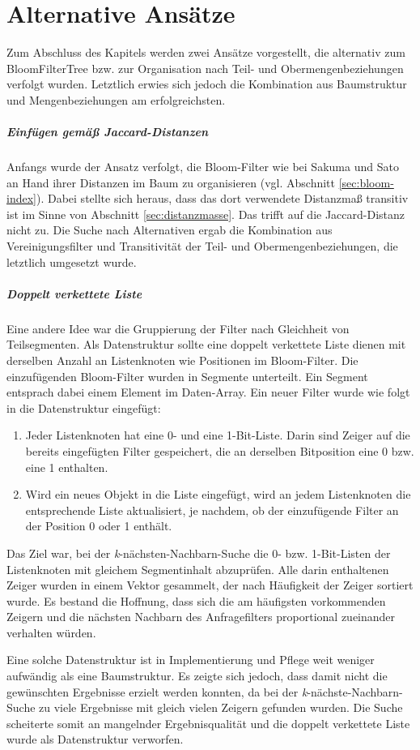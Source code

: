 \section{Alternative Ansätze}\label{sec:alternativen}
Zum Abschluss des Kapitels werden zwei Ansätze vorgestellt, die alternativ zum BloomFilterTree bzw. zur Organisation nach Teil- und Obermengenbeziehungen verfolgt wurden. Letztlich erwies sich jedoch die Kombination aus Baumstruktur und Mengenbeziehungen am erfolgreichsten. 
\subparagraph*{Einfügen gemäß Jaccard-Distanzen}
Anfangs wurde der Ansatz verfolgt, die Bloom-Filter wie bei Sakuma und Sato an Hand ihrer Distanzen im Baum zu organisieren (vgl. Abschnitt \ref{sec:bloom-index}). Dabei stellte sich heraus, dass das dort verwendete Distanzmaß transitiv ist im Sinne von Abschnitt \ref{sec:distanzmasse}. Das trifft auf die Jaccard-Distanz nicht zu. Die Suche nach Alternativen ergab die Kombination aus Vereinigungsfilter und Transitivität der Teil- und Obermengenbeziehungen, die letztlich umgesetzt wurde. 
\subparagraph*{Doppelt verkettete Liste}
Eine andere Idee war die Gruppierung der Filter nach Gleichheit von Teilsegmenten. Als Datenstruktur sollte eine doppelt verkettete Liste dienen mit derselben Anzahl an Listenknoten wie Positionen im Bloom-Filter. Die einzufügenden Bloom-Filter wurden in Segmente unterteilt. Ein Segment entsprach dabei einem Element im Daten-Array. Ein neuer Filter wurde wie folgt in die Datenstruktur eingefügt:  
\begin{enumerate}
\setlength{\itemsep}{20pt}
	\item Jeder Listenknoten hat eine 0- und eine 1-Bit-Liste. Darin sind Zeiger auf die bereits eingefügten Filter gespeichert, die an derselben Bitposition eine 0 bzw. eine 1 enthalten. 
	\item Wird ein neues Objekt in die Liste eingefügt, wird an jedem Listenknoten die entsprechende Liste aktualisiert, je nachdem, ob der einzufügende Filter an der Position 0 oder 1 enthält. 
\end{enumerate}
Das Ziel war, bei der \textit{k}-nächsten-Nachbarn-Suche die 0- bzw. 1-Bit-Listen der Listen\-knoten mit gleichem Segmentinhalt abzuprüfen. Alle darin enthaltenen Zeiger wurden in einem Vektor gesammelt, der nach Häufigkeit der Zeiger sortiert wurde. Es bestand die Hoffnung, dass sich die am häufigsten vorkommenden Zeigern und die nächsten Nachbarn des Anfragefilters proportional zueinander verhalten würden.
 
Eine solche Datenstruktur ist in Implementierung und Pflege weit weniger aufwändig als eine Baumstruktur. Es zeigte sich jedoch, dass damit nicht die gewünschten Ergebnisse erzielt werden konnten, da bei der \textit{k}-nächste-Nachbarn-Suche zu viele Ergebnisse mit gleich vielen Zeigern gefunden wurden. Die Suche scheiterte somit an mangelnder Ergebnisqualität und die doppelt verkettete Liste wurde als Datenstruktur verworfen. 